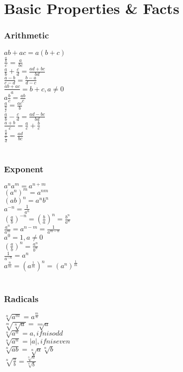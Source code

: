 \documentclass[10pt,onecolumn]{article}
\begin{document}
{\setlength{\parindent}{0cm}
\part{Basic Properties \& Facts}

\section{Arithmetic}
\(ab + ac = a(b+c) \) \\
\(\frac{\frac{a}{b}}{c}\) = \(\frac{a}{bc}\) \\
\(\frac{a}{b} + \frac{c}{d} = \frac{ad + bc}{bd}\) \\
\(\frac{a - b}{c - d} = \frac{b - a}{d - c}\) \\
\(\frac{ab + ac}{a} = b + c, a\neq 0 \) \\
\(a \frac{b}{c} = \frac{ab}{c}\) \\
\(\frac{a}{\frac{b}{c}} = \frac{ac}{b}\) \\
\(\frac{a}{b} - \frac{c}{d} = \frac{ad - bc}{bd}\) \\
\(\frac{a + b}{c} = \frac{a}{c} + \frac{b}{c}\) \\
\(\frac{\frac{a}{b}}{\frac{c}{d}} = \frac{ad}{bc}\) \\\\

\section{Exponent}
\(a^n a^m = a^{n+m} \) \\
\((a^n)^m = a^{nm} \) \\
\((ab)^n = a^n b^n\) \\
\(a^{-n} = \frac{1}{a^n}\) \\
\((\frac{a}{b})^{-n} = (\frac{b}{a})^{n} = \frac{b^n}{a^n} \) \\
\(\frac{a^n}{a^m} = a^{n-m} = \frac{1}{a^{m-n}}\) \\
\(a^0 = 1, a \neq 0 \) \\
\((\frac{a}{b})^n = \frac{a^n}{b^n}\) \\
\(\frac{1}{a^{-n}} = a^n\) \\
\(a^\frac{n}{m} = (a^\frac{1}{m})^n = (a^n)^\frac{1}{m}\) \\\\

\section{Radicals}
\(\sqrt[n]{a^m} = a^{\frac{m}{n}}\) \\
\(\sqrt[m]{\sqrt[n]{a}} = \sqrt[mn]{a}\) \\
\(\sqrt[n]{a^n} = a, if n is odd\) \\
\(\sqrt[n]{a^n} = |a|, if n is even\) \\
\(\sqrt[n]{ab} = \sqrt[n]{a}\sqrt[n]{b}\) \\
\(\sqrt[n]{\frac{a}{b}} = \frac{\sqrt[n]{a}}{\sqrt[n]{b}}\) \\

}
\end{document}
